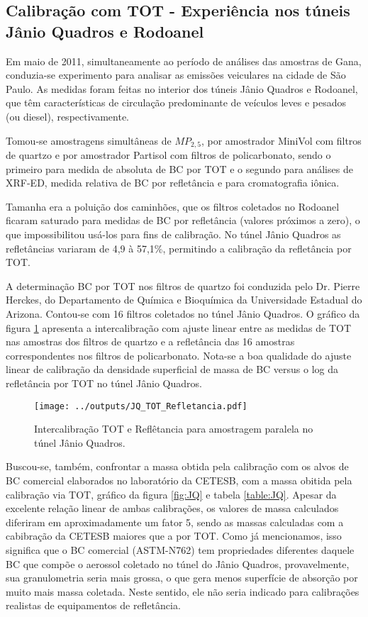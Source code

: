 \newpage
\subsection{Calibração com TOT - Experiência nos túneis Jânio Quadros e Rodoanel}

Em maio de 2011, simultaneamente ao período de análises das amostras de Gana, 
conduzia-se experimento para analisar as emissões veiculares na cidade de São 
Paulo. As medidas foram feitas no interior dos túneis Jânio Quadros e Rodoanel,
que têm características de circulação predominante de veículos leves e pesados 
(ou diesel), respectivamente. 

Tomou-se amostragens simultâneas de $MP_{2,5}$, por amostrador MiniVol com 
filtros de quartzo e por amostrador Partisol com filtros de policarbonato, 
sendo o primeiro para medida de absoluta de BC por TOT e o segundo para análises
de XRF-ED, medida relativa de BC por refletância e para cromatografia iônica.

Tamanha era a poluição dos caminhões, que os filtros coletados no Rodoanel 
ficaram saturado para medidas de BC por refletância (valores próximos a zero), 
o que impossibilitou usá-los para fins de calibração. No túnel Jânio Quadros as 
refletâncias variaram de 4,9 à 57,1\%, permitindo a calibração da refletância 
por TOT.

A determinação BC por TOT nos filtros de quartzo foi conduzida pelo Dr. Pierre 
Herckes, do Departamento de Química e Bioquímica da Universidade Estadual do 
Arizona. Contou-se com 16 filtros coletados no túnel Jânio Quadros. 
O gráfico da figura \ref{table:interJQ} apresenta a intercalibração com ajuste 
linear entre as medidas de TOT nas amostras dos filtros de quartzo e a 
refletância das 16 amostras correspondentes nos filtros de policarbonato.
Nota-se a boa qualidade do ajuste linear de calibração da densidade superficial 
de massa de BC versus o log da refletância por TOT no túnel Jânio Quadros. 

\begin{figure}[H]
  \centering
  \texttt{[image: ../outputs/JQ\_TOT\_Refletancia.pdf]}
  \caption{Intercalibração TOT e Reflêtancia para amostragem paralela no 
           túnel Jânio Quadros. \label{table:interJQ}}
\end{figure}

Buscou-se, também, confrontar a massa obtida pela calibração com os  
alvos de BC comercial elaborados no laboratório da CETESB, com a massa 
obitida pela calibração via TOT, gráfico da figura \ref{fig:JQ} e tabela
\ref{table:JQ}. Apesar da excelente relação linear de ambas calibrações, os 
valores de massa calculados diferiram em aproximadamente um fator 5, sendo as 
massas calculadas com a cabibração da CETESB maiores que a por TOT.  
Como já mencionamos, isso significa que o BC comercial (ASTM-N762) tem 
propriedades diferentes daquele BC que compõe o aerossol coletado no túnel do 
Jânio Quadros, provavelmente, sua granulometria seria mais grossa, o que gera 
menos superfície de absorção por muito mais massa coletada. Neste sentido, ele 
não seria indicado para calibrações realistas de equipamentos de refletância. 

